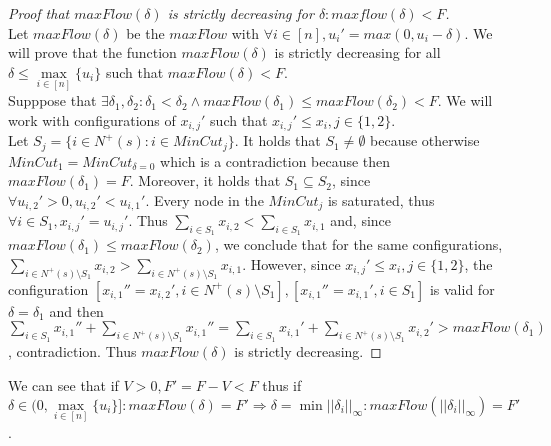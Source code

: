 \documentclass[11pt]{article}
\theoremstyle{definition}
\theoremstyle{corollary}
\theoremstyle{lemma}
\begin{document}
    \begin{proof}[Proof that $maxFlow(\delta)$ is strictly decreasing for $\delta: maxflow(\delta) < F$] \ \\
       Let $maxFlow(\delta)$ be the $maxFlow$ with $\forall i \in [n], u_i' = max(0, u_i - \delta)$.
       We will prove that the function $maxFlow(\delta)$ is strictly decreasing for all $\delta \leq \max\limits_{i \in
       [n]}\{u_i\}$ such that $maxFlow(\delta) < F$. \\
       Supppose that $\exists \delta_1, \delta_2 : \delta_1 < \delta_2 \wedge maxFlow(\delta_1) \leq maxFlow(\delta_2) < F$.
       We will work with configurations of $x_{i,j}'$ such that $x_{i,j}' \leq x_i, j \in \{1,2\}$. \\
       Let $S_j = \{i \in N^{+}(s) : i \in MinCut_j\}$. It holds that $S_1 \neq \emptyset$ because otherwise $MinCut_1 =
       MinCut_{\delta = 0}$ which is a contradiction because then $maxFlow(\delta_1) = F$. Moreover, it holds that
       $S_1 \subseteq S_2$, since $\forall u_{i,2}' > 0,u_{i,2}' < u_{i,1}'$. Every node in the $MinCut_j$ is saturated, thus
       $\forall i \in S_1, x_{i,j}' = u_{i,j}'$. Thus $\sum\limits_{i \in S_1} x_{i,2} < \sum\limits_{i \in S_1}x_{i,1}$ and,
       since $maxFlow(\delta_1) \leq maxFlow(\delta_2)$, we conclude that for the same configurations,
       $\sum\limits_{i \in N^{+}(s) \setminus S_1} x_{i,2} > \sum\limits_{i \in N^{+}(s) \setminus S_1}x_{i,1}$.
       However, since $x_{i,j}' \leq x_i, j \in \{1,2\}$, the configuration
       $[x_{i,1}'' = x_{i,2}', i \in N^{+}(s) \setminus S_1], [x_{i,1}'' = x_{i,1}', i \in S_1]$ is valid for
       $\delta = \delta_1$ and then $\sum\limits_{i \in S_1}x_{i,1}'' + \sum\limits_{i \in N^{+}(s) \setminus S_1}x_{i,1}'' =
       \sum\limits_{i \in S_1}x_{i,1}' + \sum\limits_{i \in N^{+}(s) \setminus S_1}x_{i,2}' > maxFlow(\delta_1)$,
       contradiction. Thus $maxFlow(\delta)$ is strictly decreasing.
    \end{proof}
       We can see that if $V > 0, F' = F - V < F$ thus if $\delta \in (0, \max\limits_{i \in [n]}\{u_i\}]:
       maxFlow(\delta)= F' \Rightarrow \delta = \min||\delta_i||_\infty : maxFlow(||\delta_i||_\infty) = F'$.
       
\end{document}
